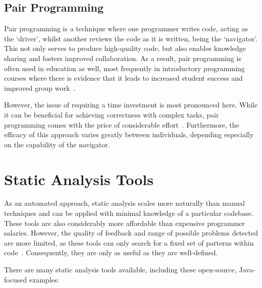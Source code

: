 \subsection{Pair Programming}
Pair programming is a technique where one programmer writes code, acting as the `driver', whilst another reviews the code as it is written, being the `navigator'. This not only serves to produce high-quality code, but also enables knowledge sharing and fosters improved collaboration. As a result, pair programming is often used in education as well, most frequently in introductory programming courses where there is evidence that it leads to increased student success and improved group work~\cite{PairProgrammingInEducation}.

However, the issue of requiring a time investment is most pronounced here. While it can be beneficial for achieving correctness with complex tasks, pair programming comes with the price of considerable effort~\cite{PairProgrammingProblems}. Furthermore, the efficacy of this approach varies greatly between individuals, depending especially on the capability of the navigator.

\section{Static Analysis Tools}

As an automated approach, static analysis scales more naturally than manual techniques and can be applied with minimal knowledge of a particular codebase. These tools are also considerably more affordable than expensive programmer salaries. However, the quality of feedback and range of possible problems detected are more limited, as these tools can only search for a fixed set of patterns within code~\cite{StaticAnalysisTools}. Consequently, they are only as useful as they are well-defined.

There are many static analysis tools available, including these open-source, Java-focused examples:

